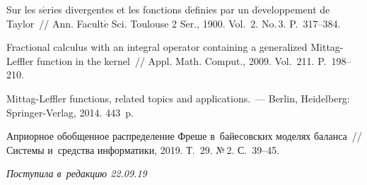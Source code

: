 \begin{multicols}{2}
{{\begin{thebibliography}{99}
Sur les s$\acute{\mbox{e}}$ries divergentes et les fonctions d$\acute{\mbox{e}}$finies 
par un d$\acute{\mbox{e}}$veloppement de Taylor~// 
Ann. Facult$\acute{\mbox{e}}$ Sci. Toulouse 2 S$\acute{\mbox{e}}$r., 
1900.  Vol.~2. No.\,3. P.~317--384.

Fractional calculus with an integral operator containing a generalized 
Mittag-Leffler function in the kernel~// 
Appl. Math. Comput., 2009. Vol.~211. P.~198--210.

Mittag-Leffler functions, related topics and applications.~--- 
Berlin, Heidelberg: Springer-Verlag, 2014. 443~p.

Априорное обобщенное распределение Фреше в~байесовских моделях баланса~// 
Системы и~средства информатики, 2019. Т.~29. №\,2. С.~39--45.
 \end{thebibliography}

 }
 }

\end{multicols}

\vspace*{-6pt}

\hfill{\small\textit{Поступила в~редакцию 22.09.19}}



\newpage

\vspace*{-28pt}





\def\tit{ON THE REPRESENTATION OF GAMMA-EXPONENTIAL 
AND~GENERALIZED NEGATIVE BINOMIAL DISTRIBUTIONS\\[-7pt]}


\def\titkol{On the representation of gamma-exponential 
and~generalized negative binomial distributions}

\def\aut{A.\,A.~Kudryavtsev\\[-9pt]}

\def\autkol{A.\,A.~Kudryavtsev}

